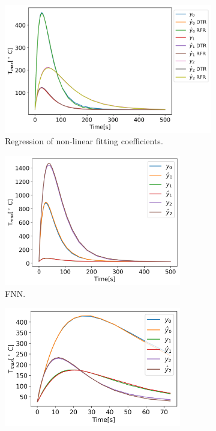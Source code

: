 \begin{figure}[htbp!] %
  \centering
  \begin{subfigure}[b]{0.49\textwidth}
    \centering
    \includegraphics[width=1.0\textwidth]{figures/regression2_good_inspect}
    \caption{Regression of non-linear fitting coefficients.}
  \end{subfigure}
  \hfill
  \begin{subfigure}[b]{0.49\textwidth}
    \centering
    \includegraphics[width=0.85\textwidth]{figures/time_fnn_inspect}
    \caption{FNN.}
  \end{subfigure}
  \par
  \begin{subfigure}[b]{0.49\textwidth}
    \centering
    \includegraphics[width=0.85\textwidth]{figures/time_lstm_inspect}

\end{subfigure}
\end{figure}
